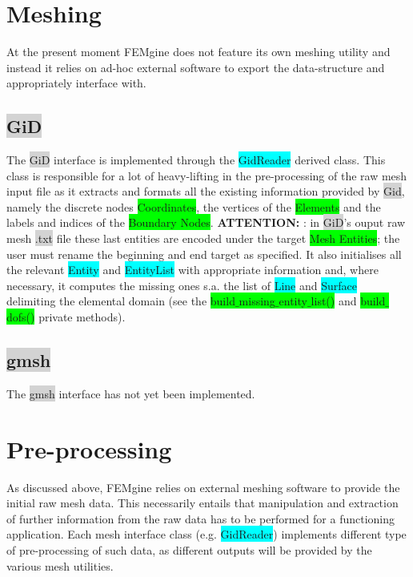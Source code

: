 \documentclass[11pt]{article}
\begin{document}
\section{Meshing}
\noindent
At the present moment FEMgine does not feature its own meshing utility and instead it relies on ad-hoc external software to export the data-structure and appropriately interface with.

\subsection{\colorbox{lightgray}{GiD}}
The \colorbox{lightgray}{GiD} interface is implemented through the \colorbox{cyan}{GidReader} derived class. This class is responsible for a lot of heavy-lifting in the pre-processing of the raw mesh input file as it extracts and formats all the existing information provided by \colorbox{lightgray}{Gid}, namely the discrete nodes \colorbox{lime}{Coordinates}, the vertices of the \colorbox{lime}{Elements} and the labels and indices of the \colorbox{lime}{Boundary Nodes}. \color{red} \textbf{ATTENTION:} \color{black}: in \colorbox{lightgray}{GiD}'s ouput raw mesh \colorbox{lightgray}{.txt} file these last entities are encoded under the target \colorbox{lime}{Mesh Entities}; the user must rename the beginning and end target as specified. It also initialises all the relevant \colorbox{cyan}{Entity} and \colorbox{cyan}{EntityList} with appropriate information and, where necessary, it computes the missing ones s.a. the list of \colorbox{cyan}{Line} and \colorbox{cyan}{Surface} delimiting the elemental domain (see the \colorbox{lime}{build$\_$missing$\_$entity$\_$list()} and \colorbox{lime}{build$\_$dofs()} private methods).

\subsection{\colorbox{lightgray}{gmsh}}
The \colorbox{lightgray}{gmsh} interface has not yet been implemented.

\section{Pre-processing}
\noindent
As discussed above, FEMgine relies on external meshing software to provide the initial raw mesh data. This necessarily entails that manipulation and extraction of further information from the raw data has to be performed for a functioning application. Each mesh interface class (e.g. \colorbox{cyan}{GidReader}) implements different type of pre-processing of such data, as different outputs will be provided by the various mesh utilities.
\end{document}
